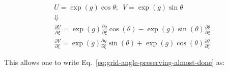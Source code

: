 \[\begin{array}{c}
U = \exp \left( g \right)\cos \theta ;\,\,\,V = \exp \left( g \right)\sin \theta \\
 \Downarrow \\
\frac{{\partial U}}{{\partial \xi }} = \exp \left( g \right)\frac{{\partial g}}{{\partial \xi }}\cos \left( \theta  \right) - \exp \left( g \right)\sin \left( \theta  \right)\frac{{\partial \theta }}{{\partial \xi }}\\
\frac{{\partial V}}{{\partial \xi }} = \exp \left( g \right)\frac{{\partial g}}{{\partial \xi }}\sin \left( \theta  \right) + \exp \left( g \right)\cos \left( \theta  \right)\frac{{\partial \theta }}{{\partial \xi }}
\end{array}\]

This allows one to write Eq.~\ref{eq:grid-angle-preserving-almost-done} as:

